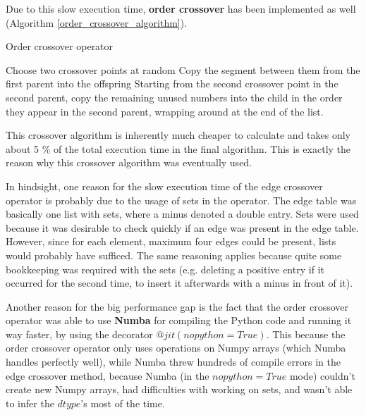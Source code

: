 \documentclass[a4paper,10pt]{article}
\begin{document}
Due to this slow execution time, \textbf{order crossover} \cite{eiben_smith} has been implemented as well (Algorithm \ref{order_crossover_algorithm}).

\begin{algorithm}
\caption{Order crossover operator \cite{eiben_smith}}\label{order_crossover_algorithm}
\begin{algorithmic}
\State Choose two crossover points at random
\State Copy the segment between them from the first parent into the offspring
\State Starting from the second crossover point in the second parent, copy the remaining unused numbers into the child in the order they appear in the second parent, wrapping around at the end of the list.
\end{algorithmic}
\end{algorithm}

This crossover algorithm is inherently much cheaper to calculate and takes only about 5 \% of the total execution time in the final algorithm. This is exactly the reason why this crossover algorithm was eventually used. 

In hindsight, one reason for the slow execution time of the edge crossover operator is probably due to the usage of sets in the operator. The edge table was basically one list with sets, where a minus denoted a double entry. Sets were used because it was desirable to check quickly if an edge was present in the edge table. However, since for each element, maximum four edges could be present, lists would probably have sufficed. The same reasoning applies because quite some bookkeeping was required with the sets (e.g. deleting a positive entry if it occurred for the second time, to insert it afterwards with a minus in front of it). 

Another reason for the big performance gap is the fact that the order crossover operator was able to use \textbf{Numba} for compiling the Python code and running it way faster, by using the decorator $@jit(nopython=True)$. This because the order crossover operator only uses operations on Numpy arrays (which Numba handles perfectly well), while Numba threw hundreds of compile errors in the edge crossover method, because Numba (in the $nopython=True$ mode) couldn't create new Numpy arrays, had difficulties with working on sets, and wasn't able to infer the $dtype$'s most of the time.

\end{document}
